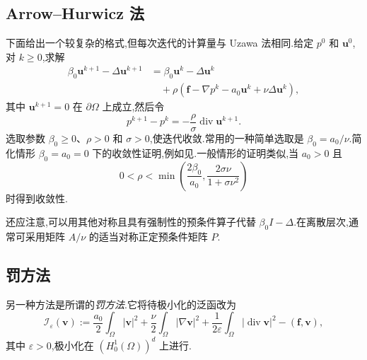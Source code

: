 \subsection{Arrow--Hurwicz 法}\label{sec:9.6.3}

下面给出一个较复杂的格式,但每次迭代的计算量与 Uzawa 法相同.给定 \(p^0\) 和 \(\boldsymbol{u}^0\),对 \(k\ge0\),求解
\begin{equation}\label{eq:9.6.6}
  \begin{aligned}
    \beta_0\boldsymbol{u}^{k+1}-\Delta\boldsymbol{u}^{k+1}
       &=\beta_0\boldsymbol{u}^k-\Delta\boldsymbol{u}^k\\
       &\quad+\rho(\boldsymbol{f}-\nabla p^k-a_0\boldsymbol{u}^k+\nu\Delta\boldsymbol{u}^k),
  \end{aligned}
\end{equation}
其中 \(\boldsymbol{u}^{k+1}=0\) 在 \(\partial\Omega\) 上成立,然后令
\begin{equation}\label{eq:9.6.7}
  p^{k+1}-p^k=-\frac{\rho}{\sigma}\operatorname{div}\boldsymbol{u}^{k+1}.
\end{equation}
选取参数 \(\beta_0\ge0\)、\(\rho>0\) 和 \(\sigma>0\),使迭代收敛.常用的一种简单选取是 \(\beta_0=a_0/\nu\).简化情形 \(\beta_0=a_0=0\) 下的收敛性证明,例如见.一般情形的证明类似,当 \(a_0>0\) 且
\[
  0<\rho<\min\left(\frac{2\beta_0}{a_0},\frac{2\sigma\nu}{1+\sigma\nu^2}\right)
\]
时得到收敛性.

还应注意,可以用其他对称且具有强制性的预条件算子代替 \(\beta_0I-\Delta\).在离散层次,通常可采用矩阵 \(A/\nu\) 的适当对称正定预条件矩阵 \(P\).

\subsection{罚方法}\label{sec:9.6.4}

另一种方法是所谓的\emph{罚方法}.它将待极小化的泛函改为
\begin{equation}\label{eq:9.6.8}
  \mathcal I_\varepsilon(\boldsymbol{v})
    :=\frac{a_0}{2}\int_\Omega|\boldsymbol{v}|^2+\frac{\nu}{2}\int_\Omega|\nabla\boldsymbol{v}|^2
       +\frac{1}{2\varepsilon}\int_\Omega|\operatorname{div}\boldsymbol{v}|^2
       -(\boldsymbol{f},\boldsymbol{v}),
\end{equation}
其中 \(\varepsilon>0\),极小化在 \((H_0^1(\Omega))^d\) 上进行.


